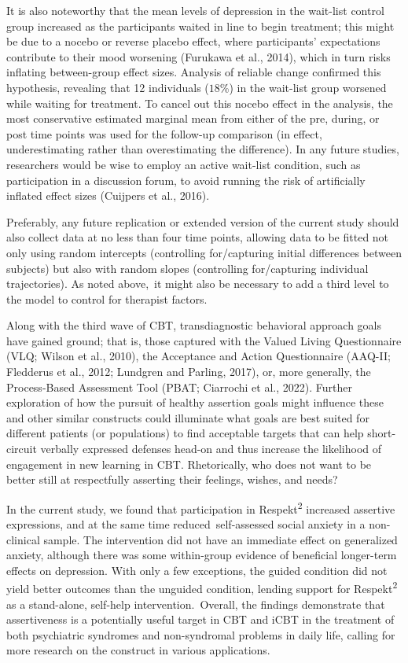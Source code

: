 \documentclass[3p]{elsarticle} %
\begin{document}
It is also noteworthy that the mean levels of depression in the
wait-list control group increased as the participants waited in line to
begin treatment; this might be due to a nocebo or reverse placebo
effect, where participants' expectations contribute to their mood
worsening (Furukawa et al., 2014), which in turn risks inflating
between-group effect sizes. Analysis of reliable change confirmed this
hypothesis, revealing that 12 individuals (\(18\)\%) in the wait-list
group worsened while waiting for treatment. To cancel out this nocebo
effect in the analysis, the most conservative estimated marginal mean
from either of the pre, during, or post time points was used for the
follow-up comparison (in effect, underestimating rather than
overestimating the difference). In any future studies, researchers would
be wise to employ an active wait-list condition, such as participation
in a discussion forum, to avoid running the risk of artificially
inflated effect sizes (Cuijpers et al., 2016).

Preferably, any future replication or extended version of the current
study should also collect data at no less than four time points,
allowing data to be fitted not only using random intercepts (controlling
for/capturing initial differences between subjects) but also with random
slopes (controlling for/capturing individual trajectories).
\color{newtext}As noted above,\color{oldtext}~it might also be necessary
to add a third level to the model to control for therapist factors.

Along with the third wave of CBT, transdiagnostic behavioral approach
goals have gained ground; that is, those captured with the Valued Living
Questionnaire (VLQ; Wilson et al., 2010), the Acceptance and Action
Questionnaire (AAQ-II; Fledderus et al., 2012; Lundgren and Parling,
2017), or, more generally, the Process-Based Assessment Tool (PBAT;
Ciarrochi et al., 2022). Further exploration of how the pursuit of
healthy assertion goals might influence these and other similar
constructs could illuminate what goals are best suited for different
patients (or populations) to find acceptable targets that can help
short-circuit verbally expressed defenses head-on and thus increase the
likelihood of engagement in new learning in CBT. Rhetorically, who does
not want to be better still at respectfully asserting their feelings,
wishes, and needs?

In the current study, we found that participation in
Respekt\textsuperscript{2} increased assertive expressions,
\color{newtext}and at the same time reduced\color{oldtext}~self-assessed
social anxiety in a non-clinical sample. The intervention did not have
an immediate effect on generalized anxiety, although there was some
within-group evidence of beneficial longer-term effects on depression.
\color{newtext}With only a few exceptions, the guided condition did not
yield better outcomes than the unguided condition, lending support for
Respekt\textsuperscript{2} as a stand-alone, self-help
intervention.\color{oldtext}~Overall, the findings demonstrate that
assertiveness is a potentially useful target in CBT and iCBT in the
treatment of both psychiatric syndromes and non-syndromal problems in
daily life, calling for more research on the construct in various
applications.
\end{document}
